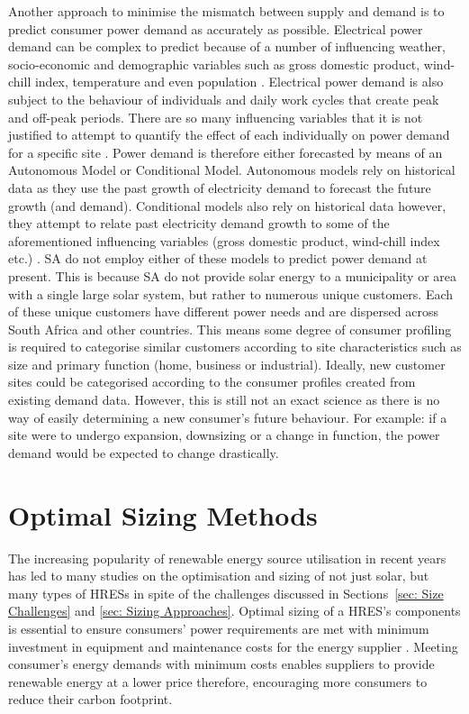 \documentclass[a4paper,11pt,fleqn]{report}
\begin{document}
Another approach to minimise the mismatch between supply and demand is to predict consumer power demand as accurately as possible. Electrical power demand can be complex to predict because of a number of influencing weather, socio-economic and demographic variables such as gross domestic product, wind-chill index, temperature and even population \citep{al1996}. Electrical power demand is also subject to the behaviour of individuals and daily work cycles that create peak and off-peak periods. There are so many influencing variables that it is not justified to attempt to quantify the effect of each individually on power demand for a specific site \citep{al1996}. Power demand is therefore either forecasted by means of an Autonomous Model or Conditional Model. Autonomous models rely on historical data as they use the past growth of electricity demand to forecast the future growth (and demand). Conditional models also rely on historical data however, they attempt to relate past electricity demand growth to some of the aforementioned influencing variables (gross domestic product, wind-chill index etc.) \citep{al1996}. \ac{SA} do not employ either of these models to predict power demand at present. This is because \ac{SA} do not provide solar energy to a municipality or area with a single large solar system, but rather to numerous unique customers. Each of these unique customers have different power needs and are dispersed across South Africa and other countries. This means some degree of consumer profiling is required to categorise similar customers according to site characteristics such as size and primary function (home, business or industrial). Ideally, new customer sites could be categorised according to the consumer profiles created from existing demand data. However, this is still not an exact science as there is no way of easily determining a new consumer's future behaviour. For example: if a site were to undergo expansion, downsizing or a change in function, the power demand would be expected to change drastically. 


\section{Optimal Sizing Methods} \label{sec: Optimal Sizing Methods}
The increasing popularity of renewable energy source utilisation in recent years has led to many studies on the optimisation and sizing of not just solar, but many types of \ac{HRES}s in spite of the challenges discussed in Sections~\ref{sec: Size Challenges} and \ref{sec: Sizing Approaches}. Optimal sizing of a \ac{HRES}'s components is essential to ensure consumers' power requirements are met with minimum investment in equipment and maintenance costs for the energy supplier \citep{erdinc2012}. Meeting consumer's energy demands with minimum costs enables suppliers to provide renewable energy at a lower price therefore, encouraging more consumers to reduce their carbon footprint. 
\end{document}
